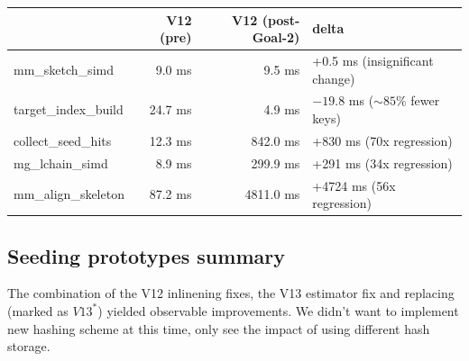 \begin{center}
  \footnotesize\ttfamily
  \setlength{\tabcolsep}{4pt}
  \begin{tabular}{@{}lrrl@{}}
    \toprule
      & V12 (pre) & V12 (post-Goal-2) & delta \\
    \midrule
    mm\_sketch\_simd     &  9.0 ms &    9.5 ms & +0.5 ms (insignificant change) \\
    target\_index\_build & 24.7 ms &    4.9 ms & $-19.8$ ms ($\sim85\%$ fewer keys) \\
    collect\_seed\_hits  & 12.3 ms &  842.0 ms & +830 ms (70x regression) \\
    mg\_lchain\_simd     &  8.9 ms &  299.9 ms & +291 ms (34x regression) \\
    mm\_align\_skeleton  & 87.2 ms & 4811.0 ms & +4724 ms (56x regression) \\
    \bottomrule
  \end{tabular}
\end{center}


\subsection{Seeding prototypes summary}

The combination of the V12 inlinening fixes, the V13 estimator fix and replacing  (marked as ${V13}^{*}$) yielded observable improvements. We didn't want to implement new hashing scheme at this time, only see the impact of using different hash storage.

